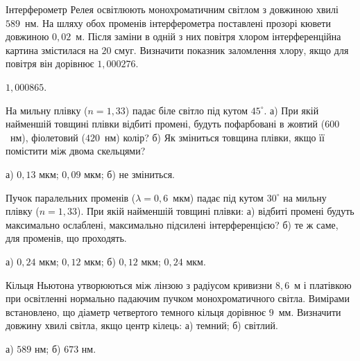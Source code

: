 \begin{problem}%
Інтерферометр Релея освітлюють монохроматичним світлом з
довжиною хвилі $589$~нм. На шляху обох променів інтерферометра
поставлені прозорі кювети довжиною $0,02$~м. Після заміни в одній з них
повітря хлором інтерференційна картина змістилася на $20$ смуг.
Визначити показник заломлення хлору, якщо для повітря він дорівнює
$1,000276$.
\begin{solution}
	$ 1,000865 $.
\end{solution}
\end{problem}


\begin{problem}%
На мильну плівку ($n = 1,33$) падає біле світло під кутом $45^\circ$. а) При
якій найменшій товщині плівки відбиті промені, будуть пофарбовані в
жовтий ($600$~нм), фіолетовий ($420$~нм) колір? б) Як зміниться товщина
плівки, якщо її помістити між двома скельцями?
\begin{solution}
	а) $ 0,13 $ мкм; $ 0,09 $ мкм; б) не зміниться.
\end{solution}
\end{problem}


\begin{problem}%
Пучок паралельних променів ($\lambda = 0,6$~мкм) падає під кутом $30^\circ$ на
мильну плівку ($ n = 1,33 $). При якій найменшій товщині плівки: а) відбиті
промені будуть максимально ослаблені, максимально підсилені
інтерференцією? б) те ж саме, для променів, що проходять.
\begin{solution}
	а) $ 0,24 $ мкм; $ 0,12 $ мкм; б) $ 0,12 $ мкм; $ 0,24 $ мкм.
\end{solution}
\end{problem}


\begin{problem}%
Кільця Ньютона утворюються між лінзою з радіусом кривизни $ 8,6 $~м і
платівкою при освітленні нормально падаючим пучком
монохроматичного світла. Вимірами встановлено, що діаметр
четвертого темного кільця дорівнює $ 9 $~мм. Визначити довжину хвилі
світла, якщо центр кілець: а) темний; б) світлий.
\begin{solution}
	а) $ 589 $ нм; б) $ 673 $ нм.
\end{solution}
\end{problem}


